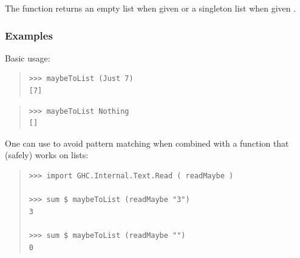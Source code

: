 \begin{haddockdesc}
\item[\begin{tabular}{@{}l}
maybeToList :: Maybe a -> {\char 91}a{\char 93}
\end{tabular}]
{\haddockbegindoc
The  function returns an empty list when given
  or a singleton list when given .\par
\subsubsection*{\textbf{Examples}}
Basic usage:\par
\begin{quote}
{\haddockverb\begin{verbatim}
>>> maybeToList (Just 7)
[7]

\end{verbatim}}
\end{quote}
\begin{quote}
{\haddockverb\begin{verbatim}
>>> maybeToList Nothing
[]

\end{verbatim}}
\end{quote}
One can use  to avoid pattern matching when combined
 with a function that (safely) works on lists:\par
\begin{quote}
{\haddockverb\begin{verbatim}
>>> import GHC.Internal.Text.Read ( readMaybe )

>>> sum $ maybeToList (readMaybe "3")
3

>>> sum $ maybeToList (readMaybe "")
0

\end{verbatim}}
\end{quote}}
\end{haddockdesc}
